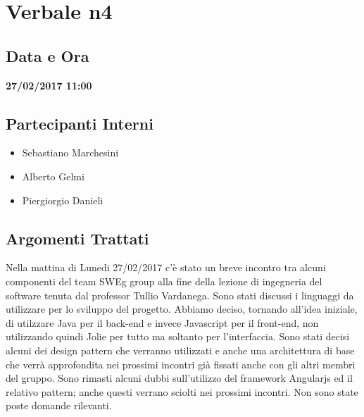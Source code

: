 \documentclass[12pt,a4paper,titlepage]{article}
\begin{document}
\section*{Verbale n4}
\subsection*{Data e Ora}
\begin{center}
\textbf{27/02/2017 11:00}
\end{center}
\subsection*{Partecipanti Interni}
\begin{itemize}
	\item Sebastiano Marchesini
	\item Alberto Gelmi
	\item Piergiorgio Danieli
\end{itemize}

\subsection*{Argomenti Trattati}
Nella mattina di Lunedi 27/02/2017 c'è stato un breve incontro tra alcuni componenti del team SWEg group alla fine della lezione di ingegneria del software tenuta dal professor Tullio Vardanega. Sono stati discussi i linguaggi da utilizzare per lo sviluppo del progetto. Abbiamo deciso, tornando all'idea iniziale, di utilzzare Java per il back-end e invece Javascript per il front-end, non utilizzando quindi Jolie per tutto ma soltanto per l'interfaccia. Sono stati decisi alcuni dei design pattern che verranno utilizzati e anche una architettura di base che verrà approfondita nei prossimi incontri già fissati anche con gli altri membri del gruppo. Sono rimasti alcuni dubbi sull'utilizzo del framework Angularjs ed il relativo pattern; anche questi verrano sciolti nei prossimi incontri. Non sono state poste domande rilevanti.
\end{document}
